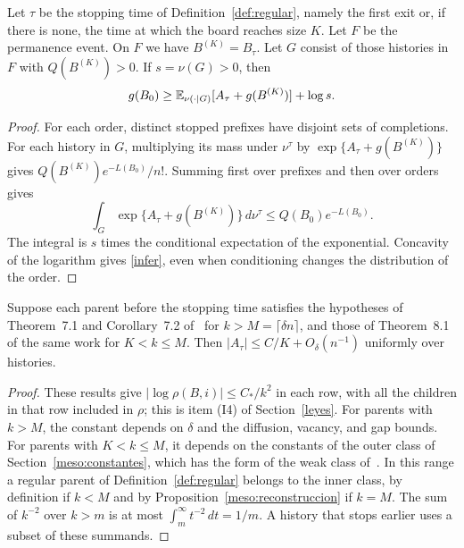 \begin{proposicion}\label{hist:inferior}
Let $\tau$ be the stopping time of Definition~\ref{def:regular}, namely the first exit or, if there is none,
the time at which the board reaches size $K$. Let $F$ be the permanence event. On $F$ we have
$B^{(K)}=B_\tau$. Let $G$ consist of those histories in $F$ with $Q(B^{(K)})>0$.
If $s=\nu(G)>0$, then
\begin{equation}\label{infer}
 g(B_0)\ge \mathbb{E}_{\nu(\cdot\mid G)}[A_\tau+g(B^{(K)})]+\log s.
\end{equation}
\end{proposicion}
\begin{proof}
For each order, distinct stopped prefixes have disjoint sets of completions. For each history in $G$,
multiplying its mass under $\nu^\tau$ by $\exp\{A_\tau+g(B^{(K)})\}$ gives
$Q(B^{(K)})e^{-L(B_0)}/n!$. Summing first
over prefixes and then over orders gives
\[
 \int_G\exp\{A_\tau+g(B^{(K)})\}\,d\nu^\tau\le Q(B_0)e^{-L(B_0)} .
\]
The integral is $s$ times the conditional expectation of the exponential. Concavity of the logarithm gives
\eqref{infer}, even when conditioning changes the distribution of the order.
\end{proof}

\begin{corolario}\label{hist:consistencia}
Suppose each parent before the stopping time satisfies the hypotheses of Theorem~7.1 and Corollary~7.2
of~\cite{pred} for $k>M=\lceil\delta n\rceil$, and those of Theorem~8.1 of the same work for $K<k\le M$.
Then $|A_\tau|\le C/K+O_\delta(n^{-1})$ uniformly over histories.
\end{corolario}
\begin{proof}
These results give $|\log\rho(B,i)|\le C_*/k^2$ in each row, with all the children in that row included in
$\rho$; this is item (I4) of Section~\ref{leyes}. For parents with $k>M$, the constant depends on
$\delta$ and the diffusion, vacancy, and gap bounds. For parents with $K<k\le M$, it depends on the
constants of the outer class of Section~\ref{meso:constantes}, which has the form of the weak class
of~\cite[Section~8.1]{pred}.
In this range a regular parent of Definition~\ref{def:regular} belongs to the inner class, by definition if
$k<M$ and by Proposition~\ref{meso:reconstruccion} if $k=M$. The sum of $k^{-2}$ over $k>m$ is at most
$\int_m^\infty t^{-2}\,dt=1/m$. A history that stops earlier uses a subset of these summands.
\end{proof}
